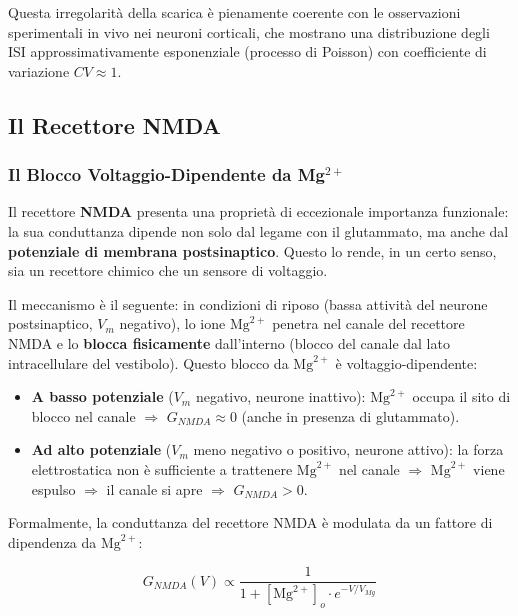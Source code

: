 Questa irregolarità della scarica è pienamente coerente con le osservazioni sperimentali in vivo nei neuroni corticali, che mostrano una distribuzione degli ISI approssimativamente esponenziale (processo di Poisson) con coefficiente di variazione $CV \approx 1$.


\subsection{Il Recettore NMDA}

\subsubsection{Il Blocco Voltaggio-Dipendente da Mg$^{2+}$}

Il recettore \textbf{NMDA} presenta una proprietà di eccezionale importanza funzionale: la sua conduttanza dipende non solo dal legame con il glutammato, ma anche dal \textbf{potenziale di membrana postsinaptico}. Questo lo rende, in un certo senso, sia un recettore chimico che un sensore di voltaggio.

Il meccanismo è il seguente: in condizioni di riposo (bassa attività del neurone postsinaptico, $V_m$ negativo), lo ione $\text{Mg}^{2+}$ penetra nel canale del recettore NMDA e lo \textbf{blocca fisicamente} dall'interno (blocco del canale dal lato intracellulare del vestibolo). Questo blocco da $\text{Mg}^{2+}$ è voltaggio-dipendente:

\begin{itemize}
    \item \textbf{A basso potenziale} ($V_m$ negativo, neurone inattivo): $\text{Mg}^{2+}$ occupa il sito di blocco nel canale $\Rightarrow$ $G_{NMDA} \approx 0$ (anche in presenza di glutammato).
    \item \textbf{Ad alto potenziale} ($V_m$ meno negativo o positivo, neurone attivo): la forza elettrostatica non è sufficiente a trattenere $\text{Mg}^{2+}$ nel canale $\Rightarrow$ $\text{Mg}^{2+}$ viene espulso $\Rightarrow$ il canale si apre $\Rightarrow$ $G_{NMDA} > 0$.
\end{itemize}

Formalmente, la conduttanza del recettore NMDA è modulata da un fattore di dipendenza da $\text{Mg}^{2+}$:

\begin{equation}
G_{NMDA}(V) \propto \frac{1}{1 + [\text{Mg}^{2+}]_o \cdot e^{-V/V_{Mg}}}
\end{equation}

